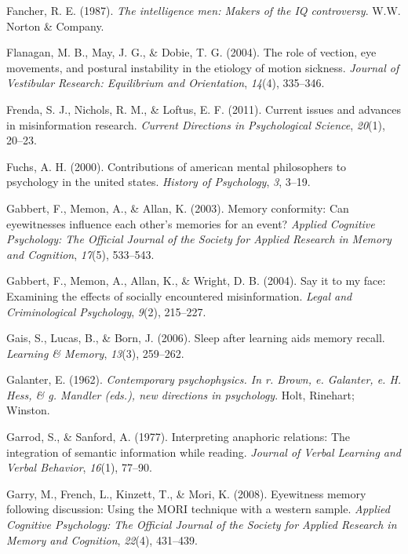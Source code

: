 \documentclass[
]{krantz}
\newlength{\cslhangindent}
\newenvironment{CSLReferences}[2] %
 {\begin{list}{}{%
  \setlength{\itemindent}{0pt}
  \setlength{\leftmargin}{0pt}
  \setlength{\parsep}{0pt}
  \ifodd #1
   \setlength{\leftmargin}{\cslhangindent}
   \setlength{\itemindent}{-1\cslhangindent}
  \fi
  \setlength{\itemsep}{#2\baselineskip}}}
 {\end{list}}
\begin{document}
\begin{CSLReferences}{1}{0}
Fancher, R. E. (1987). \emph{The intelligence men: Makers of the IQ controversy}. W.W. Norton \& Company.

Flanagan, M. B., May, J. G., \& Dobie, T. G. (2004). The role of vection, eye movements, and postural instability in the etiology of motion sickness. \emph{Journal of Vestibular Research: Equilibrium and Orientation}, \emph{14}(4), 335--346.

Frenda, S. J., Nichols, R. M., \& Loftus, E. F. (2011). Current issues and advances in misinformation research. \emph{Current Directions in Psychological Science}, \emph{20}(1), 20--23.

Fuchs, A. H. (2000). Contributions of american mental philosophers to psychology in the united states. \emph{History of Psychology}, \emph{3}, 3--19.

Gabbert, F., Memon, A., \& Allan, K. (2003). Memory conformity: Can eyewitnesses influence each other's memories for an event? \emph{Applied Cognitive Psychology: The Official Journal of the Society for Applied Research in Memory and Cognition}, \emph{17}(5), 533--543.

Gabbert, F., Memon, A., Allan, K., \& Wright, D. B. (2004). Say it to my face: Examining the effects of socially encountered misinformation. \emph{Legal and Criminological Psychology}, \emph{9}(2), 215--227.

Gais, S., Lucas, B., \& Born, J. (2006). Sleep after learning aids memory recall. \emph{Learning \& Memory}, \emph{13}(3), 259--262.

Galanter, E. (1962). \emph{Contemporary psychophysics. In r. Brown, e. Galanter, e. H. Hess, \& g. Mandler (eds.), new directions in psychology}. Holt, Rinehart; Winston.

Garrod, S., \& Sanford, A. (1977). Interpreting anaphoric relations: The integration of semantic information while reading. \emph{Journal of Verbal Learning and Verbal Behavior}, \emph{16}(1), 77--90.

Garry, M., French, L., Kinzett, T., \& Mori, K. (2008). Eyewitness memory following discussion: Using the MORI technique with a western sample. \emph{Applied Cognitive Psychology: The Official Journal of the Society for Applied Research in Memory and Cognition}, \emph{22}(4), 431--439.


\end{CSLReferences}
\end{document}
